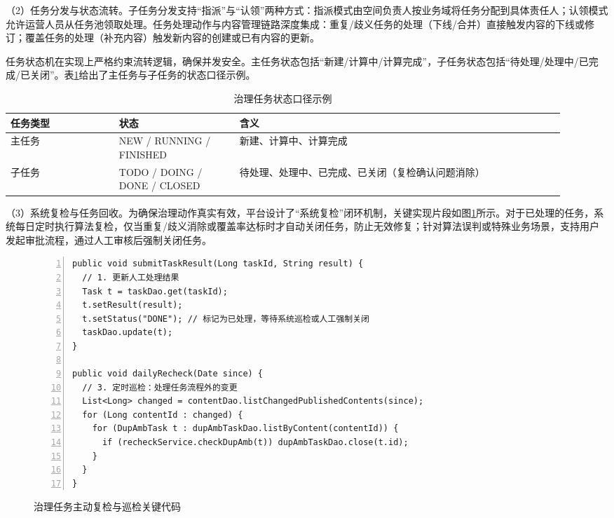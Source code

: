 （2）任务分发与状态流转。子任务分发支持“指派”与“认领”两种方式：指派模式由空间负责人按业务域将任务分配到具体责任人；认领模式允许运营人员从任务池领取处理。任务处理动作与内容管理链路深度集成：重复/歧义任务的处理（下线/合并）直接触发内容的下线或修订；覆盖任务的处理（补充内容）触发新内容的创建或已有内容的更新。

任务状态机在实现上严格约束流转逻辑，确保并发安全。主任务状态包括“新建/计算中/计算完成”，子任务状态包括“待处理/处理中/已完成/已关闭”。表\ref{tab:cg_task_status}给出了主任务与子任务的状态口径示例。

\begin{table}[!htbp]
  \centering
  \caption{治理任务状态口径示例}
  \label{tab:cg_task_status}
  \small
  \begin{tabular}{>{\raggedright\arraybackslash}p{0.18\linewidth}|>{\raggedright\arraybackslash}p{0.20\linewidth}|>{\raggedright\arraybackslash}p{0.54\linewidth}}
    \hline
    任务类型 & 状态 & 含义 \\ \hline
    主任务 & NEW / RUNNING / FINISHED & 新建、计算中、计算完成 \\ \hline
    子任务 & TODO / DOING / DONE / CLOSED & 待处理、处理中、已完成、已关闭（复检确认问题消除） \\ \hline
  \end{tabular}
\end{table}

（3）系统复检与任务回收。为确保治理动作真实有效，平台设计了“系统复检”闭环机制，关键实现片段如图\ref{fig:cg_recheck_key_code}所示。对于已处理的任务，系统每日定时执行算法复检，仅当重复/歧义消除或覆盖率达标时才自动关闭任务，防止无效修复；针对算法误判或特殊业务场景，支持用户发起审批流程，通过人工审核后强制关闭任务。

\begin{figure}[!htbp]
  \centering
  \begin{minipage}{0.94\linewidth}
    \begin{lstlisting}[basicstyle=\ttfamily\small,numbers=left,numberstyle=\tiny,frame=single,breaklines=true]
public void submitTaskResult(Long taskId, String result) {
  // 1. 更新人工处理结果
  Task t = taskDao.get(taskId);
  t.setResult(result);
  t.setStatus("DONE"); // 标记为已处理，等待系统巡检或人工强制关闭
  taskDao.update(t);
}

public void dailyRecheck(Date since) {
  // 3. 定时巡检：处理任务流程外的变更
  List<Long> changed = contentDao.listChangedPublishedContents(since);
  for (Long contentId : changed) {
    for (DupAmbTask t : dupAmbTaskDao.listByContent(contentId)) {
      if (recheckService.checkDupAmb(t)) dupAmbTaskDao.close(t.id);
    }
  }
}
    \end{lstlisting}
  \end{minipage}
  \caption{治理任务主动复检与巡检关键代码}
  \label{fig:cg_recheck_key_code}
\end{figure}

